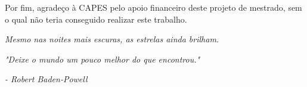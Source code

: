 Por fim, agradeço à CAPES pelo apoio financeiro deste projeto de mestrado, sem o qual não teria conseguido realizar este trabalho.



\cleardoublepage %
\null
\vfill
\hfill%
\begin{minipage}{.65\linewidth}
    \textit{Mesmo nas noites mais escuras, as estrelas ainda brilham.}

    \vspace{2cm} %

    \hfill
    \textit{"Deixe o mundo um pouco melhor do que encontrou."}
    
    \hfill
    \textit{- Robert Baden-Powell}

\end{minipage}



